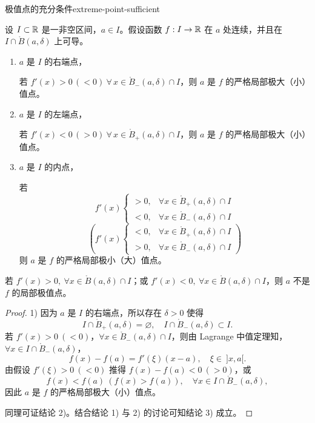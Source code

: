 \begin{mythm}{极值点的充分条件}{extreme-point-sufficient}

设 $I\subset\mathbb{R}$ 是一非空区间，$a\in I$。假设函数 $f:I\to\mathbb{R}$ 在 $a$ 处连续，并且在 $I\cap\mathring{B}(a,\delta)$ 上可导。

\begin{enumerate}[label=\arabic{enumi})]
\item $a$ 是 $I$ 的右端点，

若 $f'(x)>0\,(<0)\ \forall\,x\in\mathring{B}_-(a,\delta)\cap I$，则 $a$ 是 $f$ 的严格局部极大（小）值点。
\item $a$ 是 $I$ 的左端点，

若 $f'(x)<0\,(>0)\ \forall\,x\in\mathring{B}_+(a,\delta)\cap I$，则 $a$ 是 $f$ 的严格局部极大（小）值点。
\item $a$ 是 $I$ 的内点，

若
\[f'(x)\begin{cases} >0, & \forall x\in\mathring{B}_{+}(a,\delta)\cap I\\ <0, & \forall x\in\mathring{B}_{-}(a,\delta)\cap I \end{cases}\]
\[\left(f'(x)\begin{cases} <0, & \forall x\in\mathring{B}_{+}(a,\delta)\cap I\\ >0, & \forall x\in\mathring{B}_{-}(a,\delta)\cap I \end{cases}\right)\]
则 $a$ 是 $f$ 的严格局部极小（大）值点。
\end{enumerate}

若 $f'(x)>0,\ \forall x\in\mathring{B}(a,\delta)\cap I$；或 $f'(x)<0,\ \forall x\in\mathring{B}(a,\delta)\cap I$，则 $a$ 不是 $f$ 的局部极值点。

\end{mythm}

\begin{proof}

1) 因为 $a$ 是 $I$ 的右端点，所以存在 $\delta>0$ 使得
\[I\cap\mathring{B}_+(a,\delta)=\varnothing,\quad I\cap\mathring{B}_-(a,\delta)\subset I.\]
若 $f'(x)>0\ (<0)$，$\forall x\in\mathring{B}_-(a,\delta)\cap I$，则由 Lagrange 中值定理知，$\forall x\in I\cap\mathring{B}_-(a,\delta)$，
\[f(x)-f(a)=f'(\xi)(x-a),\quad\xi\in\ ]x,a[.\]
由假设 $f'(\xi)>0\ (<0)$ 推得 $f(x)-f(a)<0\ (>0)$，或
\[f(x)<f(a)\ (f(x)>f(a)),\quad\forall x\in I\cap\mathring{B}_-(a,\delta),\]
因此 $a$ 是 $f$ 的严格局部极大（小）值点。

同理可证结论 2)。结合结论 1) 与 2) 的讨论可知结论 3) 成立。

\end{proof}

